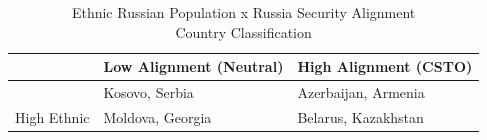 \begin{table}[!t]
\caption*{
{\large Ethnic Russian Population x Russia Security Alignment} \\ 
{\small Country Classification}
} 
\fontsize{12.0pt}{14.4pt}\selectfont
\begin{tabular*}{\linewidth}{@{\extracolsep{\fill}}lll}
\toprule
 & Low Alignment (Neutral) & High Alignment (CSTO) \\ 
\midrule\addlinespace[2.5pt]
{Low Ethnic} & {Kosovo, Serbia} & {Azerbaijan, Armenia} \\ 
{High Ethnic} & {Moldova, Georgia} & {Belarus, Kazakhstan} \\ 
\bottomrule
\end{tabular*}
\end{table}

